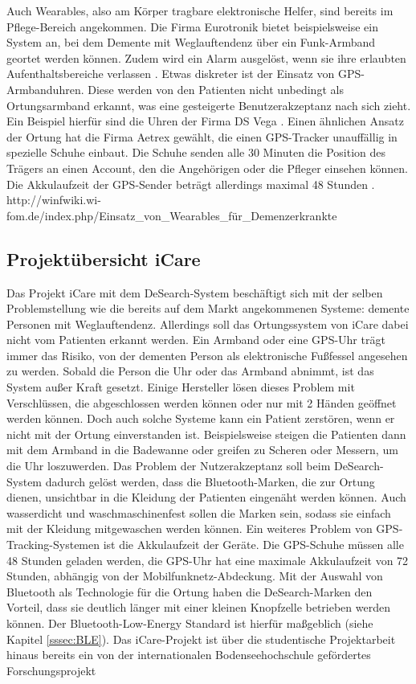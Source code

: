 Auch Wearables, also am Körper tragbare elektronische Helfer, sind bereits im Pflege-Bereich angekommen. Die Firma Eurotronik bietet beispielsweise ein System an, bei dem Demente mit Weglauftendenz über ein Funk-Armband geortet werden können. Zudem wird ein Alarm ausgelöst, wenn sie ihre erlaubten Aufenthaltsbereiche verlassen \citep[Vgl.][]{eurotronik}. Etwas diskreter ist der Einsatz von GPS-Armbanduhren. Diese werden von den Patienten nicht unbedingt als Ortungsarmband erkannt, was eine gesteigerte Benutzerakzeptanz nach sich zieht. Ein Beispiel hierfür sind die Uhren der Firma DS Vega \citep[Vgl.][]{ds-vega}.
Einen ähnlichen Ansatz der Ortung hat die Firma Aetrex gewählt, die einen GPS-Tracker unauffällig in spezielle Schuhe einbaut. Die Schuhe senden alle 30 Minuten die Position des Trägers an einen Account, den die Angehörigen oder die Pfleger einsehen können. Die Akkulaufzeit der GPS-Sender beträgt allerdings maximal 48 Stunden \citep[Vgl.][]{aetrex}.
http://winfwiki.wi-fom.de/index.php/Einsatz\_von\_Wearables\_für\_Demenzerkrankte\\




\subsection{Projektübersicht iCare}
Das Projekt iCare mit dem DeSearch-System beschäftigt sich mit der selben Problemstellung wie die bereits auf dem Markt angekommenen Systeme: demente Personen mit Weglauftendenz. Allerdings soll das Ortungssystem von iCare dabei nicht vom Patienten erkannt werden. Ein Armband oder eine GPS-Uhr trägt immer das Risiko, von der dementen Person als elektronische Fußfessel angesehen zu werden. Sobald die Person die Uhr oder das Armband abnimmt, ist das System außer Kraft gesetzt. Einige Hersteller lösen dieses Problem mit Verschlüssen, die abgeschlossen werden können oder nur mit 2 Händen geöffnet werden können. Doch auch solche Systeme kann ein Patient zerstören, wenn er nicht mit der Ortung einverstanden ist. Beispielsweise steigen die Patienten dann mit dem Armband in die Badewanne oder greifen zu Scheren oder Messern, um die Uhr loszuwerden. Das Problem der Nutzerakzeptanz soll beim DeSearch-System dadurch gelöst werden, dass die Bluetooth-Marken, die zur Ortung dienen, unsichtbar in die Kleidung der Patienten eingenäht werden können. Auch wasserdicht und waschmaschinenfest sollen die Marken sein, sodass sie einfach mit der Kleidung mitgewaschen werden können. Ein weiteres Problem von GPS-Tracking-Systemen ist die Akkulaufzeit der Geräte. Die GPS-Schuhe müssen alle 48 Stunden geladen werden, die GPS-Uhr hat eine maximale Akkulaufzeit von 72 Stunden, abhängig von der Mobilfunknetz-Abdeckung. Mit der Auswahl von Bluetooth als Technologie für die Ortung haben die DeSearch-Marken den Vorteil, dass sie deutlich länger mit einer kleinen Knopfzelle betrieben werden können. Der Bluetooth-Low-Energy Standard ist hierfür maßgeblich (siehe Kapitel \ref{sssec:BLE}). Das iCare-Projekt ist über die studentische Projektarbeit hinaus bereits ein von der internationalen Bodenseehochschule gefördertes Forschungsprojekt \citep[Vgl.][]{icare-dhbw}

